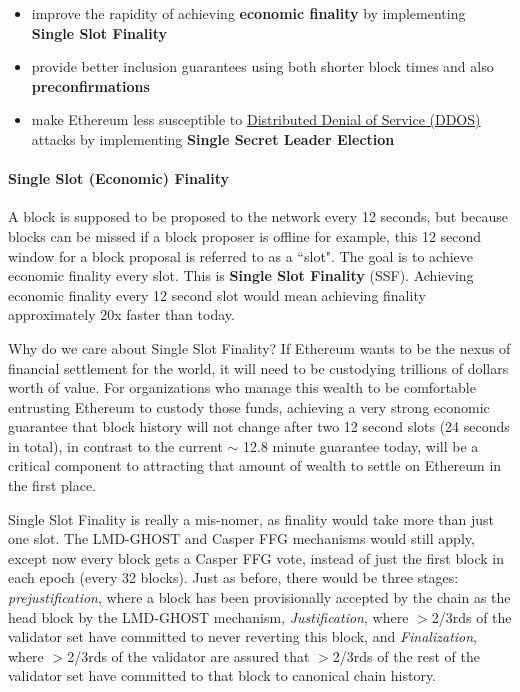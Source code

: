 \documentclass[12pt]{article}
\newcommand{\subsubsubsection}[1]{%
  \paragraph{#1}\mbox{}\par
}
\begin{document}
\begin{itemize}
    \item improve the rapidity of achieving \textbf{economic finality} by implementing \textbf{Single Slot Finality}
    \item provide better inclusion guarantees using both shorter block times and also \textbf{preconfirmations}
    \item make Ethereum less susceptible to \href{https://en.wikipedia.org/wiki/Denial-of-service_attack}{Distributed Denial of Service (DDOS)} attacks by implementing \textbf{Single Secret Leader Election}
\end{itemize}

\subsubsubsection{Single Slot (Economic) Finality}
\label{Single Slot Finality}

A block is supposed to be proposed to the network every 12 seconds, but because blocks can be missed if a block proposer is offline for example, this 12 second window for a block proposal is referred to as a ``slot". The goal is to achieve economic finality every slot. This is \textbf{Single Slot Finality} (SSF). Achieving economic finality every 12 second slot would mean achieving finality approximately 20x faster than today. 

Why do we care about Single Slot Finality? If Ethereum wants to be the nexus of financial settlement for the world, it will need to be custodying trillions of dollars worth of value. For organizations who manage this wealth to be comfortable entrusting Ethereum to custody those funds, achieving a very strong economic guarantee that block history will not change after two 12 second slots (24 seconds in total), in contrast to the current $\sim$ 12.8 minute guarantee today, will be a critical component to attracting that amount of wealth to settle on Ethereum in the first place. 

Single Slot Finality is really a mis-nomer, as finality would take more than just one slot. The LMD-GHOST and Casper FFG mechanisms would still apply, except now every block gets a Casper FFG vote, instead of just the first block in each epoch (every 32 blocks). Just as before, there would be three stages: \textit{prejustification}, where a block has been provisionally accepted by the chain as the head block by the LMD-GHOST mechanism, \textit{Justification}, where $>$2/3rds of the validator set have committed to never reverting this block, and \textit{Finalization}, where $>$2/3rds of the validator are assured that $>$2/3rds of the rest of the validator set have committed to that block to canonical chain history. 
\end{document}
